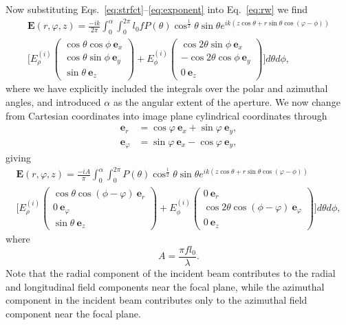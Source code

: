 \documentclass[12pt,a4paper]{article}
\begin{document}
Now substituting Eqs.~\eqref{eq:strfct}--\eqref{eq:exponent} into Eq.~\eqref{eq:rw} we find
\begin{multline}
	\label{eq:rwsub}
	\mathbf{E}\!\left(r,\varphi,z\right) = \frac{-ik}{2\pi} \int_{0}^{\alpha}\int_{0}^{2\pi}l_{0}fP\!\left(\theta\right)\cos^{\frac{1}{2}}\!{\theta}\sin{\theta}e^{ik\left(z						\cos{\theta}+r\sin{\theta}\cos{\left(\varphi - \phi\right)}\right)}\\
	\Bigg[E_{\rho}^{(i)}\begin{pmatrix}\cos{\theta}\cos{\phi}\:\textbf{e}_{x}\\ \cos{\theta}\sin{\phi}\:\textbf{e}_{y}\\ \sin{\theta}\:\textbf{e}_{z} \end{pmatrix}+E_{\phi}^{(i)}\begin{pmatrix}\cos{2\theta}\sin{\phi}\:\textbf{e}_{x}\\ -	\cos{2\theta}\cos{\phi}\:\textbf{e}_{y} \\ 0\:\textbf{e}_{z} \end{pmatrix}\Bigg] d\theta d\phi,
\end{multline}
where we have explicitly included the integrals over the polar and azimuthal angles, and introduced \(\alpha\) as the angular extent of the aperture. We now change from Cartesian coordinates into image plane cylindrical coordinates through
\begin{align}
		\mathbf{e}_{r} &= \cos{\varphi}\:\mathbf{e}_{x} + \sin{\varphi}\:\mathbf{e}_{y}, \nonumber \\
		\mathbf{e}_{\varphi} &= \sin{\varphi}\:\mathbf{e}_{x} - \cos{\varphi}\:\mathbf{e}_{y}, \nonumber
\end{align}
giving
\begin{multline}
	\label{eq:final}
	\mathbf{E}\!\left(r,\varphi,z\right) = \frac{-iA}{\pi} \int_{0}^{\alpha}\int_{0}^{2\pi}P\!\left(\theta\right)\cos^{\frac{1}{2}}\!{\theta}\sin{\theta}e^{ik\left(z						\cos{\theta}+r\sin{\theta}\cos{\left(\varphi - \phi\right)}\right)}\\
	\Bigg[E_{\rho}^{(i)}\begin{pmatrix}\cos{\theta}\cos{\left(\phi-\varphi\right)}\:\textbf{e}_{r}\\ 0\:\textbf{e}_{\varphi}\\ \sin{\theta}\:\textbf{e}_{z} \end{pmatrix}+E_{\phi}^{(i)}\begin{pmatrix} 0\:\textbf{e}_{r}\\ \cos{2\theta}\cos{\left(\phi-\varphi\right)}\:\textbf{e}_{\varphi} \\ 0\:\textbf{e}_{z} \end{pmatrix}\Bigg] d\theta d\phi,
\end{multline}
where
\begin{displaymath}
	A = \frac{\pi f l_{0}}{\lambda}.
\end{displaymath}
Note that the radial component of the incident beam contributes to the radial and longitudinal field components near the focal plane, while the azimuthal component in the incident beam contributes only to the azimuthal field component near the focal plane.
\end{document}
